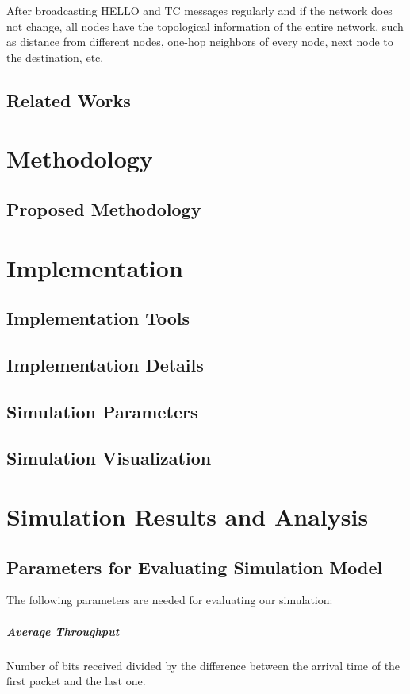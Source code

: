 \documentclass[12pt,a4paper]{report}
\begin{document}
After broadcasting HELLO and TC messages regularly and if the network does
not change, all nodes have the topological information of the entire network, such
as distance from different nodes, one-hop neighbors of every node, next node to the
destination, etc.
\section{Related Works}

\chapter{Methodology}

\section{Proposed Methodology}

\chapter{Implementation}
\section{Implementation Tools}
\section{Implementation Details}
\section{Simulation Parameters}
\section{Simulation Visualization}



\chapter{Simulation Results and Analysis}

\section{Parameters for Evaluating Simulation Model}
The following parameters are needed for evaluating our simulation:
\paragraph{Average Throughput}
Number of bits received divided by the difference between the arrival time of the first packet and the last one.
\end{document}
